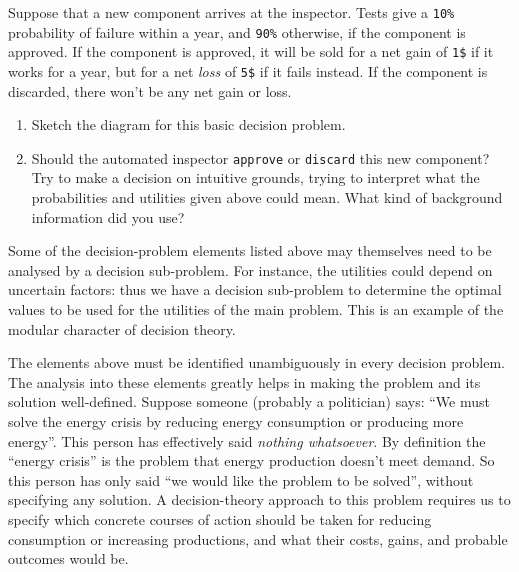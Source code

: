 \documentclass[
  a4paper,
  DIV=11,
  numbers=noendperiod,
  oneside]{scrreprt}
\begin{document}
\begin{tcolorbox}[enhanced jigsaw, bottomrule=.15mm, leftrule=.75mm, opacitybacktitle=0.6, breakable, toptitle=1mm, coltitle=black, title={Exercise}, rightrule=.15mm, left=2mm, colframe=quarto-callout-caution-color-frame, bottomtitle=1mm, arc=.35mm, titlerule=0mm, toprule=.15mm, opacityback=0, colback=white, colbacktitle=quarto-callout-caution-color!10!white]

Suppose that a new component arrives at the inspector. Tests give a
\texttt{10\%} probability of failure within a year, and \texttt{90\%}
otherwise, if the component is approved. If the component is approved,
it will be sold for a net gain of \texttt{1\$} if it works for a year,
but for a net \emph{loss} of \texttt{5\$} if it fails instead. If the
component is discarded, there won't be any net gain or loss.

\begin{enumerate}
\def\labelenumi{\arabic{enumi}.}
\item
  Sketch the diagram for this basic decision problem.
\item
  Should the automated inspector \texttt{approve} or \texttt{discard}
  this new component? Try to make a decision on intuitive grounds,
  trying to interpret what the probabilities and utilities given above
  could mean. What kind of background information did you use?
\end{enumerate}

\end{tcolorbox}

Some of the decision-problem elements listed above may themselves need
to be analysed by a decision sub-problem. For instance, the utilities
could depend on uncertain factors: thus we have a decision sub-problem
to determine the optimal values to be used for the utilities of the main
problem. This is an example of the modular character of decision theory.

The elements above must be identified unambiguously in every decision
problem. The analysis into these elements greatly helps in making the
problem and its solution well-defined. Suppose someone (probably a
politician) says: ``We must solve the energy crisis by reducing energy
consumption or producing more energy''. This person has effectively said
\emph{nothing whatsoever}. By definition the ``energy crisis'' is the
problem that energy production doesn't meet demand. So this person has
only said ``we would like the problem to be solved'', without specifying
any solution. A decision-theory approach to this problem requires us to
specify which concrete courses of action should be taken for reducing
consumption or increasing productions, and what their costs, gains, and
probable outcomes would be.
\end{document}
